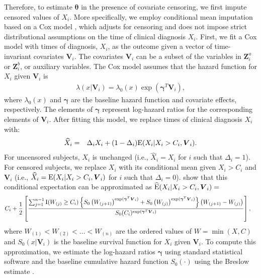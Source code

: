 \documentclass[12pt]{article}
\def\wh{\widehat}
\def\bse{\begin{eqnarray*}}
\def\ese{\end{eqnarray*}}
\def\be{\begin{eqnarray}}
\def\ee{\end{eqnarray}}
\def\bse{\begin{eqnarray*}}
\def\ese{\end{eqnarray*}}
\def\wh{\widehat}
\newcommand{\bgamma}{\mbox{\boldmath $\gamma$}}
\def\btheta{{\boldsymbol{\theta}}}
\def\bgamma{{\boldsymbol{\gamma}}}
\def\bV{{\boldsymbol V}}
\def\bZ{{\boldsymbol Z}}
\begin{document}
Therefore, to estimate $\btheta$ in the presence of covariate censoring, we first impute censored values of $X_i$. 
More specifically, we employ conditional mean imputation based on a Cox model \citep{Atem2019, correctingCMI}, which adjusts for censoring and does not impose strict distributional assumptions on the time of clinical diagnosis $X_i$. First, we fit a Cox model with times of diagnosis, $X_i$, as the outcome given a vector of time-invariant covariates $\bV_i$. The covariates $\bV_i$ can be a subset of the variables in $\bZ^a_i$ or $\bZ^b_i$, or auxiliary variables. 
The Cox model assumes that the hazard function for $X_i$ given $\bV_i$ is
\bse
\lambda(x|\bV_i)=\lambda_0(x)\exp(\bgamma^T\bV_i),
\ese
where $\lambda_0(x)$ and  $\bgamma$ are the baseline hazard function and covariate effects, respectively. The elements of $\bgamma$ represent log-hazard ratios for the corresponding elements of $\bV_i$. After fitting this model, we replace times of clinical diagnosis $X_i$ with: 
\be
\label{eqn:def_X_i_star}
\widehat{X}_i&=&\Delta_iX_i+(1-\Delta_i){\rm E}(X_i|X_i>C_i,\bV_i).
\ee
For uncensored subjects, $X_i$ is unchanged (i.e., $\widehat{X}_i=X_i$ for $i$ such that $\Delta_i = 1$). For censored subjects, we replace $X_i$ with its conditional mean given $X_i>C_i$ and $\bV_i$ (i.e., $\widehat{X}_i={\rm E}(X_i|X_i>C_i,\bV_i)$ for $i$ such that $\Delta_i = 0$). 
\cite{correctingCMI} show that this conditional expectation can be approximated as $\widehat{\rm E}(X_i|X_i>C_i,\bV_i) =$
\bse
& C_i + \frac{1}{2}\left[\frac{\sum_{j=1}^{n-1}{\rm I}(W_{(j)} \geq C_i)\left\{S_{0}\left(W_{(j+1)}\right)^{\exp(\bgamma^T\bV_i)}+ S_{0}\left(W_{(j)}\right)^{\exp(\bgamma^T\bV_i)}\right\}\left(W_{(j+1)}-W_{(j)}\right)}{S_{0}(C_i)^{\exp(\bgamma^T\bV_i)}}\right],
\ese
where $W_{(1)} < W_{(2)} < \dots < W_{(n)}$ are the ordered values of $W = \min(X, C)$ and $S_0(x|\bV_i)$ is the baseline survival function for $X_i$ given $\bV_i$. To compute this approximation, we estimate the log-hazard ratios $\bgamma$ using standard statistical software and the baseline cumulative hazard function $S_0(\cdot)$ using the Breslow estimate \citep{breslow1972contribution}.
\end{document}
